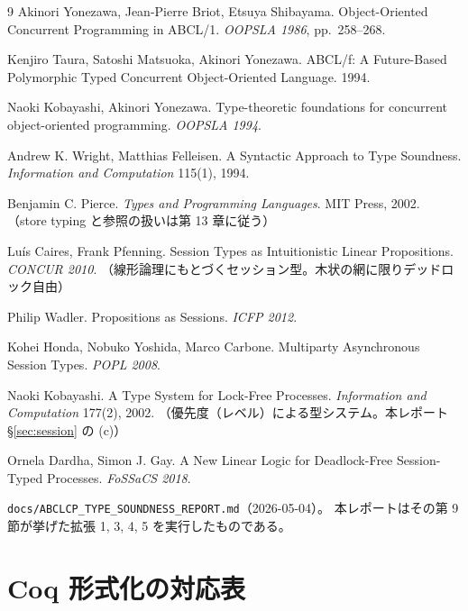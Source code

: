 \documentclass[11pt,a4paper]{ltjsarticle}
\theoremstyle{definition}
\theoremstyle{remark}
\begin{document}
\begin{thebibliography}{9}
Akinori Yonezawa, Jean-Pierre Briot, Etsuya Shibayama.
\newblock Object-Oriented Concurrent Programming in ABCL/1.
\newblock \emph{OOPSLA 1986}, pp.~258--268.

Kenjiro Taura, Satoshi Matsuoka, Akinori Yonezawa.
\newblock ABCL/f: A Future-Based Polymorphic Typed Concurrent Object-Oriented
Language. 1994.

Naoki Kobayashi, Akinori Yonezawa.
\newblock Type-theoretic foundations for concurrent object-oriented programming.
\newblock \emph{OOPSLA 1994}.

Andrew K. Wright, Matthias Felleisen.
\newblock A Syntactic Approach to Type Soundness.
\newblock \emph{Information and Computation} 115(1), 1994.

Benjamin C. Pierce.
\newblock \emph{Types and Programming Languages}. MIT Press, 2002.
\newblock （store typing と参照の扱いは第 13 章に従う）

Lu\'is Caires, Frank Pfenning.
\newblock Session Types as Intuitionistic Linear Propositions.
\newblock \emph{CONCUR 2010}.
\newblock （線形論理にもとづくセッション型。木状の網に限りデッドロック自由）

Philip Wadler.
\newblock Propositions as Sessions.
\newblock \emph{ICFP 2012}.

Kohei Honda, Nobuko Yoshida, Marco Carbone.
\newblock Multiparty Asynchronous Session Types.
\newblock \emph{POPL 2008}.

Naoki Kobayashi.
\newblock A Type System for Lock-Free Processes.
\newblock \emph{Information and Computation} 177(2), 2002.
\newblock （優先度（レベル）による型システム。本レポート \S\ref{sec:session} の (c)）

Ornela Dardha, Simon J. Gay.
\newblock A New Linear Logic for Deadlock-Free Session-Typed Processes.
\newblock \emph{FoSSaCS 2018}.

\verb|docs/ABCLCP_TYPE_SOUNDNESS_REPORT.md|（2026-05-04）。
\newblock 本レポートはその第 9 節が挙げた拡張 1, 3, 4, 5 を実行したものである。
\end{thebibliography}

\appendix
\section{Coq 形式化の対応表}
\end{document}
